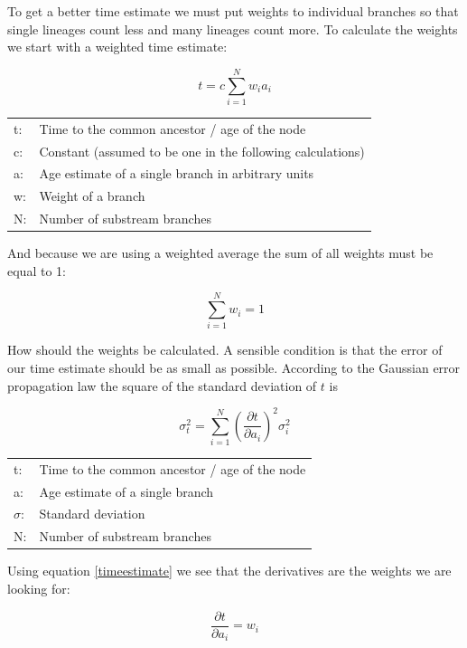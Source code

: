 To get a better time estimate we must put weights to individual
branches so that single lineages count less and many lineages
count more. To calculate the weights we start with a weighted
time estimate:

\begin{equation}
t = c \sum_{i = 1}^{N} w_i a_i    \label{timeestimate}
\end{equation}

\begin{tabular}{ll}
t: &  Time to the common ancestor / age of the node\\
c: &  Constant (assumed to be one in the following calculations)\\
a: &  Age estimate of a single branch in arbitrary units\\
w: &  Weight of a branch\\
N: &  Number of substream branches
\end{tabular}
\vspace{1em}

And because we are using a weighted average the sum of all
weights must be equal to 1:

\begin{equation}
\sum_{i = 1}^{N} w_i = 1  \label{normalization}
\end{equation}

How should the weights be calculated. A sensible condition
is that the error of our time estimate should be as small as
possible. According to the Gaussian error propagation law
the square of the standard deviation of $t$ is

\begin{equation}
\sigma_t^2 = \sum_{i = 1}^{N} \left(\frac{\partial t}{\partial a_i}
\right)^2 \sigma_i^2  \label{gauss}
\end{equation}

\begin{tabular}{ll}
t: &  Time to the common ancestor / age of the node\\
a: &  Age estimate of a single branch\\
$\sigma$: &  Standard deviation\\
N: &  Number of substream branches
\end{tabular}
\vspace{1em}

Using equation \ref{timeestimate} we see that the derivatives
are the weights we are looking for:

\begin{equation}
\frac{\partial t}{\partial a_i} = w_i
\end{equation}


